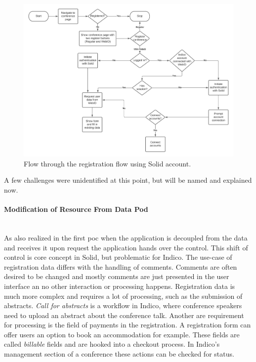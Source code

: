 \begin{figure}[H]
    \centering
    \includegraphics[width=1\textwidth]{prototype/graphs/poc-conference_registration_flow-sideways.jpeg}
    \caption{Flow through the registration flow using Solid account.}
    \label{fig:poc-conference_registration_flow-sideways}
\end{figure}

A few challenges were unidentified at this point, but will be named and explained now.
\vspace{0.5cm}
\paragraph{Modification of Resource From Data Pod}\mbox{}\\

As also realized in the first \gls{poc} when the application is decoupled from the data and receives it upon request the application hands over the control. This shift of control is core concept in Solid, but problematic for Indico. The use-case of registration data differs with the handling of comments. Comments are often desired to be changed and mostly comments are just presented in the user interface an no other interaction or processing happens. Registration data is much more complex and requires a lot of processing, such as the submission of abstracts. \textit{Call for abstracts} is a workflow in Indico, where conference speakers need to upload an abstract about the conference talk. Another are requirement for processing is the field of payments in the registration. A registration form can offer users an option to book an accommodation for example. These fields are called \textit{billable} fields and are hooked into a checkout process. In Indico's management section of a conference these actions can be checked for status.

